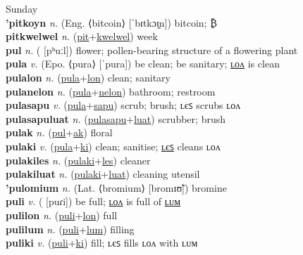 Sunday \label{pitsunkwelwel} \\
\textbf{'pitkoyn} \textit{n.} (Eng. ⟨bitcoin⟩ [ˈbɪtkɔɪ̯n])
bitcoin; ₿ \label{'pitkoyn} \\
\textbf{pitkwelwel} \textit{n.} (\hyperref[pit]{pit}+\hyperref[kwelwel]{kwelwel})
week \label{pitkwelwel} \\
\textbf{pul} \textit{n.} ( [pʰuːl])
flower; pollen-bearing structure of a flowering plant \label{pul} \\
\textbf{pula} \textit{v.} (Epo. ⟨pura⟩ [ˈpura])
be clean; be sanitary; \hyperref[pulalon]{ʟᴏᴧ} is clean \label{pula} \\
\textbf{pulalon} \textit{n.} (\hyperref[pula]{pula}+\hyperref[lon]{lon})
clean; sanitary \label{pulalon} \\
\textbf{pulanelon} \textit{n.} (\hyperref[pula]{pula}+\hyperref[nelon]{nelon})
bathroom; restroom \label{pulanelon} \\
\textbf{pulasapu} \textit{v.} (\hyperref[pula]{pula}+\hyperref[sapu]{sapu})
scrub; brush; ʟєꜱ scrubs ʟᴏᴧ \label{pulasapu} \\
\textbf{pulasapuluat} \textit{n.} (\hyperref[pulasapu]{pulasapu}+\hyperref[luat]{luat})
scrubber; brush \label{pulasapuluat} \\
\textbf{pulak} \textit{n.} (\hyperref[pul]{pul}+\hyperref[ak]{ak})
floral \label{pulak} \\
\textbf{pulaki} \textit{v.} (\hyperref[pula]{pula}+\hyperref[ki]{ki})
clean; sanitise; \hyperref[pulakiles]{ʟєꜱ} cleans ʟᴏᴧ \label{pulaki} \\
\textbf{pulakiles} \textit{n.} (\hyperref[pulaki]{pulaki}+\hyperref[les]{les})
cleaner \label{pulakiles} \\
\textbf{pulakiluat} \textit{n.} (\hyperref[pulaki]{pulaki}+\hyperref[luat]{luat})
cleaning utensil \label{pulakiluat} \\
\textbf{'pulomium} \textit{n.} (Lat. ⟨bromium⟩ [bromɪʊ̃])
bromine \label{'pulomium} \\
\textbf{puli} \textit{v.} ( [puɾi])
be full; \hyperref[pulilon]{ʟᴏᴧ} is full of \hyperref[pulilum]{ʟᴜᴍ} \label{puli} \\
\textbf{pulilon} \textit{n.} (\hyperref[puli]{puli}+\hyperref[lon]{lon})
full \label{pulilon} \\
\textbf{pulilum} \textit{n.} (\hyperref[puli]{puli}+\hyperref[lum]{lum})
filling \label{pulilum} \\
\textbf{puliki} \textit{v.} (\hyperref[puli]{puli}+\hyperref[ki]{ki})
fill; ʟєꜱ fills ʟᴏᴧ with ʟᴜᴍ \label{puliki} \\
